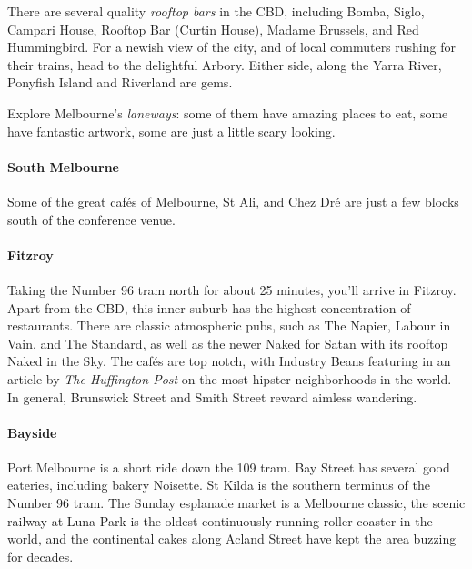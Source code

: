 There are several quality \emph{rooftop bars} in the CBD,
including Bomba, Siglo, Campari
House, Rooftop Bar (Curtin House), Madame Brussels, and Red Hummingbird.
For a newish view of the city, and of local commuters rushing for
their trains, head to the delightful Arbory. Either side, along the 
Yarra River, Ponyfish Island and Riverland are gems.

Explore Melbourne's {\em laneways}: some of them have amazing places to 
eat,
some have fantastic artwork, some are just a little scary looking.

\paragraph{South Melbourne}

Some of the great caf{\'e}s of Melbourne, St Ali, and Chez Dr{\'e}
are just a few blocks south of the conference venue.

\paragraph{Fitzroy}

Taking the Number 96 tram north for about 25 minutes, you'll arrive in
Fitzroy.
Apart from the CBD, this inner suburb has the highest concentration of
restaurants.
There are classic atmospheric pubs, such as The Napier, Labour in
Vain, and The Standard, as well as the newer Naked for Satan with its 
rooftop
Naked in the Sky.
The caf{\'e}s are top notch, with Industry Beans
featuring in an article by {\em The Huffington Post} on the most hipster
neighborhoods in the world.
In general, Brunswick Street and Smith Street reward aimless wandering.

 

\paragraph{Bayside}

Port Melbourne is a short ride down the 109 tram. Bay Street has several good
eateries, including bakery Noisette.
St Kilda is the southern terminus of the Number 96 tram. The Sunday 
esplanade
market is a Melbourne classic, the scenic railway at Luna Park is the 
oldest
continuously running roller coaster in the world, and the continental 
cakes
along Acland Street have kept the area buzzing for decades.
